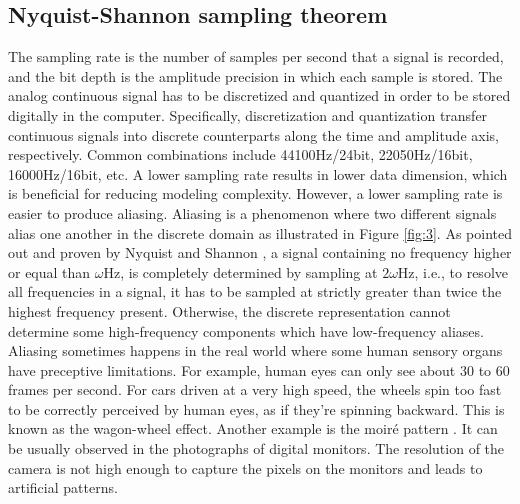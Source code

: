 \documentclass[12pt]{article}
\begin{document}
\subsection{Nyquist-Shannon sampling theorem} The sampling rate is the number of samples per second that a signal is recorded, and the bit depth is the amplitude precision in which each sample is stored. The analog continuous signal has to be discretized and quantized in order to be stored digitally in the computer. Specifically, discretization and quantization transfer continuous signals into discrete counterparts along the time and amplitude axis, respectively. Common combinations include 44100Hz/24bit, 22050Hz/16bit, 16000Hz/16bit, etc. A lower sampling rate results in lower data dimension, which is beneficial for reducing modeling complexity. However, a lower sampling rate is easier to produce aliasing. Aliasing is a phenomenon where two different signals alias one another in the discrete domain as illustrated in Figure \ref{fig:3}. As pointed out and proven by Nyquist \cite{nyq28} and Shannon \cite{sha48}, a signal containing no frequency higher or equal than $\omega$Hz, is completely determined by sampling at $2\omega$Hz, i.e., to resolve all frequencies in a signal, it has to be sampled at strictly greater than twice the highest frequency present. Otherwise, the discrete representation cannot determine some high-frequency components which have low-frequency aliases. Aliasing sometimes happens in the real world where some human sensory organs have preceptive limitations. For example, human eyes can only see about 30 to 60 frames per second. For cars driven at a very high speed, the wheels spin too fast to be correctly perceived by human eyes, as if they're spinning backward. This is known as the wagon-wheel effect. Another example is the moiré pattern \cite{dan62}. It can be usually observed in the photographs of digital monitors. The resolution of the camera is not high enough to capture the pixels on the monitors and leads to artificial patterns.
\end{document}
